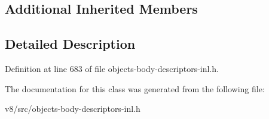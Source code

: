 \subsection*{Additional Inherited Members}


\subsection{Detailed Description}


Definition at line 683 of file objects-\/body-\/descriptors-\/inl.\+h.



The documentation for this class was generated from the following file\+:\begin{DoxyCompactItemize}
\item 
v8/src/objects-\/body-\/descriptors-\/inl.\+h\end{DoxyCompactItemize}
